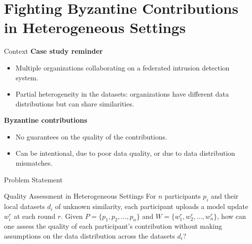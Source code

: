 

\section{Fighting Byzantine Contributions in Heterogeneous Settings}

\begin{frame}
  \sectionpage

\end{frame}


\begin{frame}{Context}
  \textbf{Case study reminder}
  \begin{itemize}
    \item Multiple organizations collaborating on a federated intrusion detection system.
    \item Partial heterogeneity in the datasets: organizations have different data distributions but can share similarities.
  \end{itemize}

  \textbf{Byzantine contributions}
  \begin{itemize}
    \item No guarantees on the quality of the contributions.
    \item Can be intentional, due to poor data quality, or due to data distribution mismatches.
  \end{itemize}

\end{frame}

\begin{frame}{Problem Statement}
  \begin{block}{Quality Assessment in Heterogeneous Settings}
    For $n$ participants $p_i$ and their local datasets $d_i$ of unknown similarity, each participant uploads a model update $w_i^r$ at each round $r$. Given $P = \{ p_1, p_2, \dots, p_n \} $ and $W = \{ w_1^r, w_2^r, \dots, w_n^r \} $, how can one assess the quality of each participant’s contribution without making assumptions on the data distribution across the datasets $d_i$?
  \end{block}
\end{frame}


